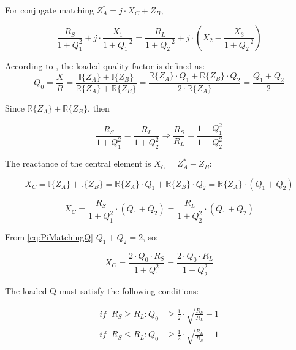 \noindent For conjugate matching $Z_A^* = j·X_C + Z_B$,

\begin{equation}
\frac{R_S}{1 + Q_1^2} + j \cdot \frac{X_1}{1 + Q_1^{-2}} = \frac{R_L}{1 + Q_2^{-2}} + j \cdot \left( X_2 - \frac{X_3}{1 + Q_2^{-2}} \right)
\end{equation}

\noindent According to \cite{YSunMatching}, the loaded quality factor is defined as:
\begin{equation}
Q_0 = \frac{X}{R} = \frac{\mathbb{I} \lbrace Z_A \rbrace + \mathbb{I} \lbrace Z_B \rbrace}{\mathbb{R} \lbrace Z_A \rbrace + \mathbb{R} \lbrace Z_B \rbrace} = \frac{\mathbb{R} \lbrace Z_A\rbrace \cdot Q_1 + \mathbb{R} \lbrace Z_B\rbrace \cdot Q_2}{2 \cdot \mathbb{R} \lbrace Z_A\rbrace} = \frac{Q_1 + Q_2}{2}
\label{eq:PiMatchingQ}
\end{equation}

\noindent Since $\mathbb{R} \lbrace Z_A \rbrace + \mathbb{R} \lbrace Z_B \rbrace$, then

\begin{equation}
\frac{R_S}{1 + Q_1^2} = \frac{R_L}{1 + Q_2^2} \Longrightarrow \frac{R_S}{R_L} = \frac{1 + Q_1^2}{1 + Q_2^2}
\end{equation}

\noindent The reactance of the central element is $X_C = Z_A^* - Z_B$:

\begin{equation}
X_C = \mathbb{I} \lbrace Z_A \rbrace + \mathbb{I} \lbrace Z_B \rbrace = \mathbb{R} \lbrace Z_A \rbrace  \cdot Q_1 + \mathbb{R} \lbrace Z_B \rbrace \cdot Q_2 = \mathbb{R} \lbrace Z_A \rbrace \cdot (Q_1 + Q_2)
\end{equation}

\begin{equation}
X_C = \frac{R_S}{1 + Q_1^2} \cdot (Q_1 + Q_2) = \frac{R_L}{1 + Q_2^2} \cdot (Q_1 + Q_2)
\end{equation}

\noindent From \ref{eq:PiMatchingQ} $Q_1 + Q_2 = 2$, so:

\begin{equation}
X_C = \frac{2 \cdot Q_0 \cdot R_S}{1 + Q_1^2} = \frac{2 \cdot Q_0 \cdot R_L}{1 + Q_2^2}
\end{equation}

\noindent The loaded Q must satisfy the following conditions:

\begin{align}
       if \;\; R_S \ge R_L:    Q_0 &\ge \frac{1}{2} \cdot \sqrt{\frac{R_S}{R_L} -1 }\\
       if \;\; R_S \le R_L:    Q_0 &\ge \frac{1}{2} \cdot \sqrt{\frac{R_L}{R_S} -1 }
\end{align}


